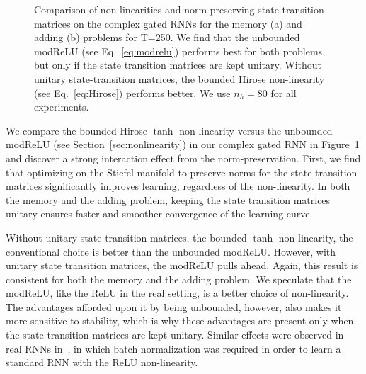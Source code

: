 \documentclass{article}
\begin{document}
\begin{figure}[t!]
    \centering
{}
\qquad
{}%
    \caption{\small Comparison of non-linearities and norm preserving state transition matrices on the complex gated RNNs for the memory (a) and adding (b) problems for T=250.  We find that the unbounded modReLU (see Eq.~\ref{eq:modrelu}) performs best for both problems, but only if the state transition matrices are kept unitary.  Without unitary state-transition matrices, the bounded Hirose non-linearity (see Eq.~\ref{eq:Hirose}) performs better. We use $n_h=80$ for all experiments.}
    \label{fig:complex_results}
    \vspace{-0.5cm}
\end{figure}

We compare the bounded Hirose $\tanh$ non-linearity versus the unbounded modReLU (see Section~\ref{sec:nonlinearity}) in our complex gated RNN in Figure~\ref{fig:complex_results} and discover a strong interaction effect from the norm-preservation.  First, we find that optimizing on the Stiefel manifold to preserve norms for the state transition matrices significantly improves learning, regardless of the non-linearity.  In both the memory and the adding problem, keeping the state transition matrices unitary ensures faster and smoother convergence of the learning curve. 

Without unitary state transition matrices, the bounded $\tanh$ non-linearity, \ie the conventional choice is better than the unbounded modReLU.  However, with unitary state transition matrices, the modReLU pulls ahead.  Again, this result is consistent for both the memory and the adding problem.  We speculate that the modReLU, like the ReLU in the real setting, is a better choice of non-linearity.  The advantages afforded upon it by being unbounded, however, also makes it more sensitive to stability, which is why these advantages are present only when the state-transition matrices are kept unitary.  Similar effects were observed in real RNNs in~\cite{Ravanelli2017ImprovingSR}, in which batch normalization was required in order to learn a standard RNN with the ReLU non-linearity.
\end{document}
